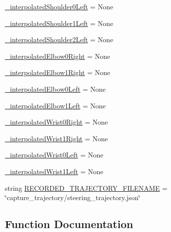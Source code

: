 \begin{DoxyCompactItemize}
\item 
\mbox{\hyperlink{namespacesteering__test_a50591c0fabe0d8cf1fedfd3b538992d9}{\+\_\+interpolated\+Shoulder0\+Left}} = None
\item 
\mbox{\hyperlink{namespacesteering__test_af46054dbeef09ffce30b7d50b1758ecd}{\+\_\+interpolated\+Shoulder1\+Left}} = None
\item 
\mbox{\hyperlink{namespacesteering__test_addc28d27a306147fd68f91f76137270f}{\+\_\+interpolated\+Shoulder2\+Left}} = None
\item 
\mbox{\hyperlink{namespacesteering__test_a7dc185bebcf84e31dbfd18e35ee98c46}{\+\_\+interpolated\+Elbow0\+Right}} = None
\item 
\mbox{\hyperlink{namespacesteering__test_aed3843da8f4e40c3d458e6ff63f85409}{\+\_\+interpolated\+Elbow1\+Right}} = None
\item 
\mbox{\hyperlink{namespacesteering__test_a92aadc71d408047922404222dfe37a49}{\+\_\+interpolated\+Elbow0\+Left}} = None
\item 
\mbox{\hyperlink{namespacesteering__test_ac7389593a79be110c81842a8b08a5934}{\+\_\+interpolated\+Elbow1\+Left}} = None
\item 
\mbox{\hyperlink{namespacesteering__test_ac79bf1d739355ad1fd01b0ef34285850}{\+\_\+interpolated\+Wrist0\+Right}} = None
\item 
\mbox{\hyperlink{namespacesteering__test_a766681a5e5bab545136c5be5020ab64b}{\+\_\+interpolated\+Wrist1\+Right}} = None
\item 
\mbox{\hyperlink{namespacesteering__test_a37854f696367444dc12b7a43a32abdcd}{\+\_\+interpolated\+Wrist0\+Left}} = None
\item 
\mbox{\hyperlink{namespacesteering__test_a2ebebc3e0e89d5392c129040eac10e23}{\+\_\+interpolated\+Wrist1\+Left}} = None
\item 
string \mbox{\hyperlink{namespacesteering__test_a494831a8cc281783b78dbd045fe69b16}{R\+E\+C\+O\+R\+D\+E\+D\+\_\+\+T\+R\+A\+J\+E\+C\+T\+O\+R\+Y\+\_\+\+F\+I\+L\+E\+N\+A\+ME}} = \char`\"{}capture\+\_\+trajectory/steering\+\_\+trajectory.\+json\char`\"{}
\end{DoxyCompactItemize}


\subsection{Function Documentation}
\mbox{\label{namespacesteering__test_ac212ddb8df1b385c31ae7edabcc19e02}} 
